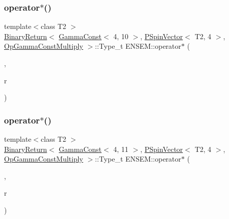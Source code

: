\subsubsection{\texorpdfstring{operator$\ast$()}{operator*()}\hspace{0.1cm}{\footnotesize\ttfamily [11/32]}}
{\footnotesize\ttfamily template$<$class T2 $>$ \\
\mbox{\hyperlink{structENSEM_1_1BinaryReturn}{Binary\+Return}}$<$ \mbox{\hyperlink{classENSEM_1_1GammaConst}{Gamma\+Const}}$<$ 4, 10 $>$, \mbox{\hyperlink{classENSEM_1_1PSpinVector}{P\+Spin\+Vector}}$<$ T2, 4 $>$, \mbox{\hyperlink{structENSEM_1_1OpGammaConstMultiply}{Op\+Gamma\+Const\+Multiply}} $>$\+::Type\+\_\+t E\+N\+S\+E\+M\+::operator$\ast$ (\begin{DoxyParamCaption}\item[{const \mbox{\hyperlink{classENSEM_1_1GammaConst}{Gamma\+Const}}$<$ 4, 10 $>$ \&}]{,  }\item[{const \mbox{\hyperlink{classENSEM_1_1PSpinVector}{P\+Spin\+Vector}}$<$ T2, 4 $>$ \&}]{r }\end{DoxyParamCaption})\hspace{0.3cm}{\ttfamily [inline]}}

\mbox{\label{group__primspinvector_ga4bbdc1bc935fc4378105903d7b0fb65d}} 
\subsubsection{\texorpdfstring{operator$\ast$()}{operator*()}\hspace{0.1cm}{\footnotesize\ttfamily [12/32]}}
{\footnotesize\ttfamily template$<$class T2 $>$ \\
\mbox{\hyperlink{structENSEM_1_1BinaryReturn}{Binary\+Return}}$<$ \mbox{\hyperlink{classENSEM_1_1GammaConst}{Gamma\+Const}}$<$ 4, 11 $>$, \mbox{\hyperlink{classENSEM_1_1PSpinVector}{P\+Spin\+Vector}}$<$ T2, 4 $>$, \mbox{\hyperlink{structENSEM_1_1OpGammaConstMultiply}{Op\+Gamma\+Const\+Multiply}} $>$\+::Type\+\_\+t E\+N\+S\+E\+M\+::operator$\ast$ (\begin{DoxyParamCaption}\item[{const \mbox{\hyperlink{classENSEM_1_1GammaConst}{Gamma\+Const}}$<$ 4, 11 $>$ \&}]{,  }\item[{const \mbox{\hyperlink{classENSEM_1_1PSpinVector}{P\+Spin\+Vector}}$<$ T2, 4 $>$ \&}]{r }\end{DoxyParamCaption})\hspace{0.3cm}{\ttfamily [inline]}}

